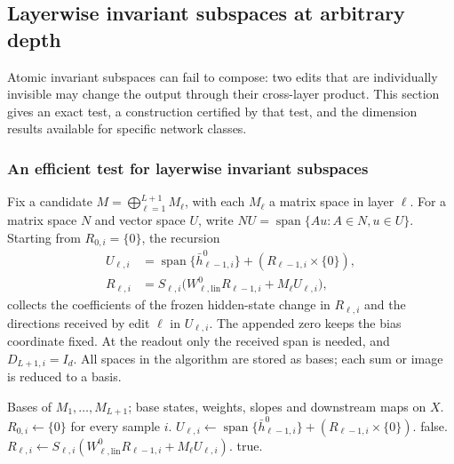 \documentclass[twoside]{article}
\theoremstyle{remark}
\DeclareMathOperator{\spanop}{span}
\theoremstyle{highlightdefinition}
\theoremstyle{remark}
\newcommand{\spn}{\spanop}
\begin{document}
\subsection{Layerwise invariant subspaces at arbitrary depth}
\label{app:composition-proof}
Atomic invariant subspaces can fail to compose: two edits that are individually invisible may change the output through their cross-layer product. This section gives an exact test, a construction certified by that test, and the dimension results available for specific network classes.

\subsubsection{An efficient test for layerwise invariant subspaces}
Fix a candidate $M=\bigoplus_{\ell=1}^{L+1}M_\ell$, with each $M_\ell$ a matrix space in layer $\ell$. For a matrix space $N$ and vector space $U$, write $NU=\spn\{Au:A\in N,u\in U\}$. Starting from $R_{0,i}=\{0\}$, the recursion
\begin{align}
 U_{\ell,i}&=\spn\{\bar h_{\ell-1,i}^0\}+(R_{\ell-1,i}\times\{0\}),\label{eq:received}\\
 R_{\ell,i}&=S_{\ell,i}\bigl(W_{\ell,\mathrm{lin}}^0R_{\ell-1,i}+M_\ell U_{\ell,i}\bigr),\nonumber
\end{align}
collects the coefficients of the frozen hidden-state change in $R_{\ell,i}$ and the directions received by edit $\ell$ in $U_{\ell,i}$. The appended zero keeps the bias coordinate fixed. At the readout only the received span is needed, and $D_{L+1,i}=I_d$. All spaces in the algorithm are stored as bases; each sum or image is reduced to a basis.

\begin{algorithm}[H]
\caption{Exact layerwise invariant subspace test}\label{alg:app-branch-test}
\small
\begin{algorithmic}[1]
\Require Bases of $M_1,\ldots,M_{L+1}$; base states, weights, slopes and downstream maps on $X$.
\State $R_{0,i}\gets\{0\}$ for every sample $i$.
  \State $U_{\ell,i}\gets\spn\{\bar h_{\ell-1,i}^0\}+(R_{\ell-1,i}\times\{0\})$.
   \State \Return false.
  \EndIf
   \State $R_{\ell,i}\gets S_{\ell,i}(W_{\ell,\mathrm{lin}}^0R_{\ell-1,i}+M_\ell U_{\ell,i})$.
  \EndIf
 \EndFor
\EndFor
\State \Return true.
\end{algorithmic}
\end{algorithm}
\end{document}
